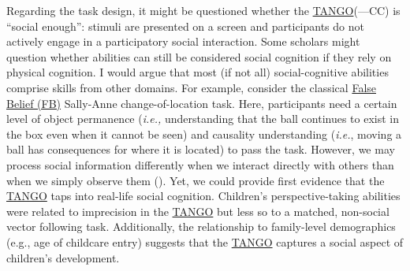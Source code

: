 \documentclass[
]{scrbook}
\begin{document}
Regarding the task design, it might be questioned whether the \hyperref[acronyms_TANGO]{TANGO}(---CC) is ``social enough'': stimuli are presented on a screen and participants do not actively engage in a participatory social interaction. Some scholars might question whether abilities can still be considered social cognition if they rely on physical cognition. I would argue that most (if not all) social-cognitive abilities comprise skills from other domains. For example, consider the classical \hyperref[acronyms_FB]{False Belief (FB)} Sally-Anne change-of-location task. Here, participants need a certain level of object permanence (\emph{i.e.,} understanding that the ball continues to exist in the box even when it cannot be seen) and causality understanding (\emph{i.e.}, moving a ball has consequences for where it is located) to pass the task. However, we may process social information differently when we interact directly with others than when we simply observe them (). Yet, we could provide first evidence that the \hyperref[acronyms_TANGO]{TANGO} taps into real-life social cognition. Children's perspective-taking abilities were related to imprecision in the \hyperref[acronyms_TANGO]{TANGO} but less so to a matched, non-social vector following task. Additionally, the relationship to family-level demographics (e.g., age of childcare entry) suggests that the \hyperref[acronyms_TANGO]{TANGO} captures a social aspect of children's development.
\end{document}
